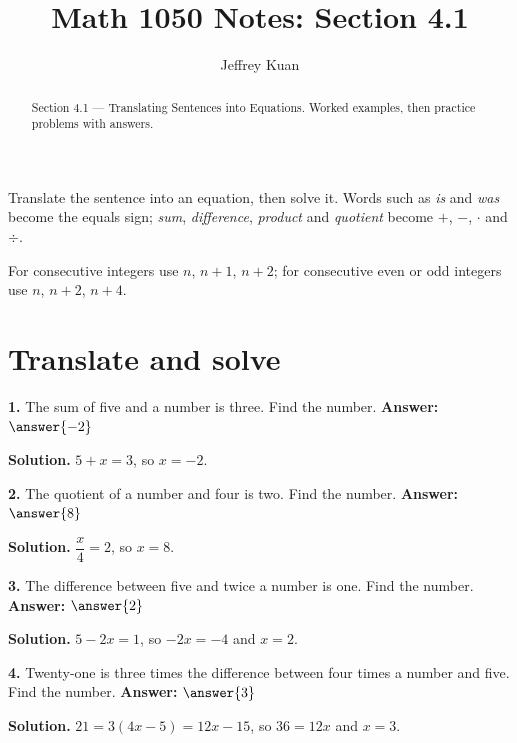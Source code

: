 \documentclass{ximera}
\author{Jeffrey Kuan}
\title{Math 1050 Notes: Section 4.1}
\begin{document}
\begin{abstract}
    Section 4.1 --- Translating Sentences into Equations.
    Worked examples, then practice problems with answers.
\end{abstract}

\maketitle

Translate the sentence into an equation, then solve it. Words such as \emph{is} and
\emph{was} become the equals sign; \emph{sum}, \emph{difference}, \emph{product} and
\emph{quotient} become $+$, $-$, $\cdot$ and $\div$.

For consecutive integers use $n$, $n+1$, $n+2$; for consecutive even or odd integers use
$n$, $n+2$, $n+4$.

\section*{Translate and solve}

\begin{problem}
\textbf{1.} The sum of five and a number is three. Find the number.
\qquad \textbf{Answer:} $\answer{-2}$

\begin{hint}
\textbf{Solution.} $5+x=3$, so $x=-2$.
\end{hint}
\end{problem}

\begin{problem}
\textbf{2.} The quotient of a number and four is two. Find the number.
\qquad \textbf{Answer:} $\answer{8}$

\begin{hint}
\textbf{Solution.} $\dfrac{x}{4}=2$, so $x=8$.
\end{hint}
\end{problem}

\begin{problem}
\textbf{3.} The difference between five and twice a number is one. Find the number.
\qquad \textbf{Answer:} $\answer{2}$

\begin{hint}
\textbf{Solution.} $5-2x=1$, so $-2x=-4$ and $x=2$.
\end{hint}
\end{problem}

\begin{problem}
\textbf{4.} Twenty-one is three times the difference between four times a number and five.
Find the number. \qquad \textbf{Answer:} $\answer{3}$

\begin{hint}
\textbf{Solution.} $21=3(4x-5)=12x-15$, so $36=12x$ and $x=3$.
\end{hint}
\end{problem}
\end{document}
